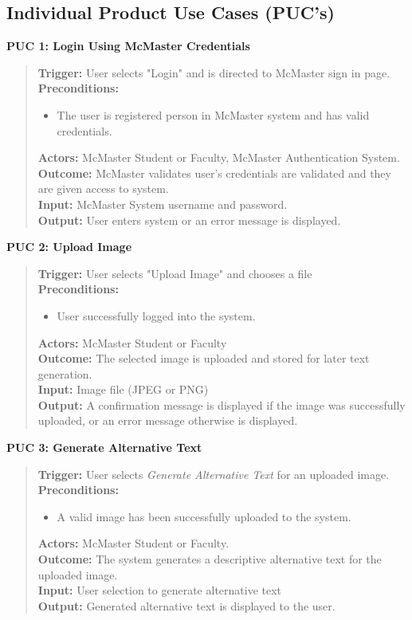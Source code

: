 \documentclass[12pt]{article}
\begin{document}
\subsection{Individual Product Use Cases (PUC's)}
\textbf{PUC 1: Login Using McMaster Credentials }
\begin{quote}
  \textbf{Trigger:} User selects "Login" and is directed to McMaster
  sign in page.\\
  \textbf{Preconditions:}
  \begin{itemize}
    \item The user is registered person in McMaster system and has
      valid credentials.
  \end{itemize}
  \textbf{Actors:} McMaster Student or Faculty, McMaster
  Authentication System.\\
  \textbf{Outcome:} McMaster validates user's credentials are
  validated and they are given access to system.\\
  \textbf{Input:} McMaster System username and password. \\
  \textbf{Output:} User enters system or an error message is displayed.
\end{quote}
\textbf{PUC 2: Upload Image }
\begin{quote}
  \textbf{Trigger:} User selects "Upload Image" and chooses a file\\
  \textbf{Preconditions:}
  \begin{itemize}
    \item User successfully logged into the system.
  \end{itemize}
  \textbf{Actors:} McMaster Student or Faculty \\
  \textbf{Outcome:} The selected image is uploaded and stored for
  later text generation.\\
  \textbf{Input:} Image file (JPEG or PNG) \\
  \textbf{Output:} A confirmation message is displayed if the image
  was successfully uploaded, or an error message otherwise is displayed.
\end{quote}
\textbf{PUC 3: Generate Alternative Text}
\begin{quote}
  \textbf{Trigger:} User selects \textit{Generate Alternative Text}
  for an uploaded image.\\
  \textbf{Preconditions:}
  \begin{itemize}
    \item A valid image has been successfully uploaded to the system.
  \end{itemize}
  \textbf{Actors:} McMaster Student or Faculty.\\
  \textbf{Outcome:} The system generates a descriptive alternative
  text for the uploaded image.\\
  \textbf{Input:} User selection to generate alternative text\\
  \textbf{Output:} Generated alternative text is displayed to the user.
\end{quote}
\end{document}

